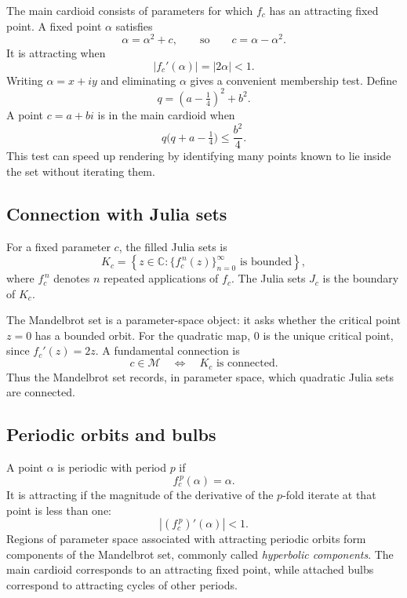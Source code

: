 \documentclass[a4paper, 10pt, onepage]{elegantbook}
\begin{document}
{The main cardioid consists of parameters for which $f_c$ has an
attracting fixed point. A fixed point $\alpha$ satisfies
\begin{equation}
  \alpha=\alpha^2+c,
  \qquad\text{so}\qquad
  c=\alpha-\alpha^2.
\end{equation}
It is attracting when
\begin{equation}
  |f_c'(\alpha)|=|2\alpha|<1.
\end{equation}
Writing $\alpha=x+iy$ and eliminating $\alpha$ gives a convenient
membership test. Define
\[
  q=(a-\tfrac14)^2+b^2.
\]
A point $c=a+bi$ is in the main cardioid when
\begin{equation}
  q\bigl(q+a-\tfrac14\bigr)\leq \frac{b^2}{4}.
\end{equation}
This test can speed up rendering by identifying many points known to
lie inside the set without iterating them.

\subsection{Connection with Julia sets}

\noindent

For a fixed parameter $c$, the filled Julia sets is
\begin{equation}
  K_c=
  \left\{z\in\mathbb{C}:
  \{f_c^{\,n}(z)\}_{n=0}^{\infty}
  \text{ is bounded}\right\},
\end{equation}
where $f_c^{\,n}$ denotes $n$ repeated applications of $f_c$. The
Julia sets $J_c$ is the boundary of $K_c$.

The Mandelbrot set is a parameter-space object: it asks whether the
critical point $z=0$ has a bounded orbit. For the quadratic map,
$0$ is the unique critical point, since $f_c'(z)=2z$. A fundamental
connection is
\begin{equation}
  c\in\mathcal{M}
  \quad\Longleftrightarrow\quad
  K_c\text{ is connected}.
\end{equation}
Thus the Mandelbrot set records, in parameter space, which quadratic
Julia sets are connected.

\subsection{Periodic orbits and bulbs}

A point $\alpha$ is periodic with period $p$ if
\begin{equation}
  f_c^{\,p}(\alpha)=\alpha.
\end{equation}
It is attracting if the magnitude of the derivative of the
$p$-fold iterate at that point is less than one:
\begin{equation}
  \left|(f_c^{\,p})'(\alpha)\right|<1.
\end{equation}
Regions of parameter space associated with attracting periodic orbits
form components of the Mandelbrot set, commonly called
\emph{hyperbolic components}. The main cardioid corresponds to an
attracting fixed point, while attached bulbs correspond to attracting
cycles of other periods.

}
\end{document}
